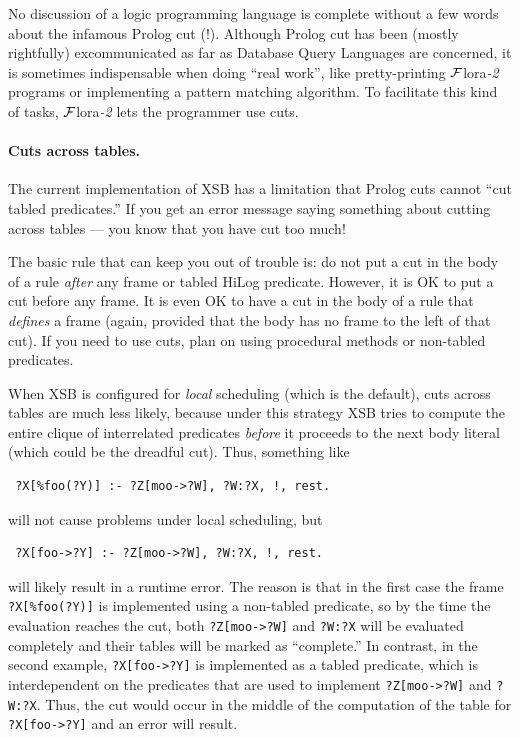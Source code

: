 \documentclass[11pt]{article}
\newcommand{\FLSYSTEM}{{\mbox{\sc ${\cal F}${lora}\rm\emph{-2}}}\xspace}
\begin{document}
\index{cut!in \FLSYSTEM}
No discussion of a logic programming language is complete without a few
words about the infamous Prolog cut (!). Although Prolog cut has been
(mostly rightfully) excommunicated as far as Database Query Languages are
concerned, it is sometimes indispensable when doing ``real work'', like
pretty-printing \FLSYSTEM programs or implementing a pattern matching
algorithm.  To facilitate this kind of tasks, \FLSYSTEM lets the programmer
use cuts. 

\paragraph{Cuts across tables.}
The current implementation of XSB has a limitation that
Prolog cuts cannot ``cut tabled predicates.''  If you get an error
message saying something about cutting across tables --- you know that
you have cut too much!

The basic rule that can keep you out of trouble is: do not put a cut in the
body of a rule \emph{after} any frame or tabled  HiLog
predicate. However, it is OK to put a cut before any frame. It is
even OK to have a cut in the body of a rule that \emph{defines} a
frame (again, provided that the body has no frame to the left of
that cut). If you need to use cuts, plan on using procedural methods or
non-tabled predicates.

When XSB is configured for \emph{local} scheduling (which is the
default), cuts across
tables are much less likely, because under this strategy XSB tries to
compute the entire clique of interrelated predicates \emph{before} it
proceeds to the next body literal (which could be the dreadful cut).
Thus, something like
\begin{verbatim}
 ?X[%foo(?Y)] :- ?Z[moo->?W], ?W:?X, !, rest.  
\end{verbatim}
will not cause problems under local scheduling, but
\begin{verbatim}
 ?X[foo->?Y] :- ?Z[moo->?W], ?W:?X, !, rest.  
\end{verbatim}
will likely result in a runtime error. The reason is that in the first case
the frame \verb|?X[%foo(?Y)]| is implemented using a non-tabled predicate, so
by the time the evaluation reaches the cut, both \verb|?Z[moo->?W]| and 
{\tt ?W:?X} will be evaluated completely and their tables will be marked as
``complete.'' In contrast, in the second example, \verb|?X[foo->?Y]| is
implemented as a tabled predicate, which is interdependent on the
predicates that are used to implement \verb|?Z[moo->?W]| and 
{\tt ?W:?X}. Thus, the cut would occur in the middle of the computation of
the table for \verb|?X[foo->?Y]| and an error will result.
\end{document}
